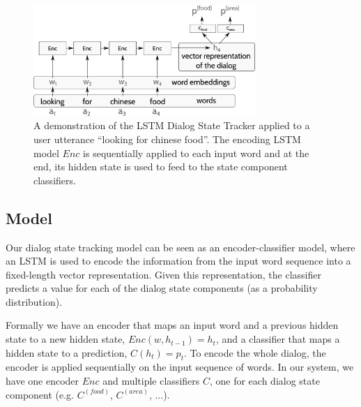 \documentclass[11pt,twocolumn]{article}
\begin{document}
\begin{figure}
\center
\includegraphics[width=0.75\textwidth]{arch}
\caption{A demonstration of the LSTM Dialog State Tracker applied to a user utterance ``looking for chinese food''. The encoding LSTM model $Enc$ is sequentially applied to each input word and at the end, its hidden state is used to feed to the state component classifiers.}
\label{fig:LecTrack}
\end{figure}

\subsection{Model}
Our dialog state tracking model can be seen as an encoder-classifier model, where an LSTM is used to encode the information from the input word sequence into a fixed-length vector representation. Given this representation, the classifier predicts a value for each of the dialog state components (as a probability distribution).

Formally we have an encoder that maps an input word and a previous hidden state to a new hidden state, $Enc(w, h_{t-1})=h_t$, and a classifier that maps a hidden state to a prediction, $C(h_t)=p_t$. To encode the whole dialog, the encoder is applied sequentially on the input sequence of words. In our system, we have one encoder $Enc$ and multiple classifiers $C$, one for each dialog state component (e.g. $C^{(food)}$, $C^{(area)}$, ...).

\end{document}
